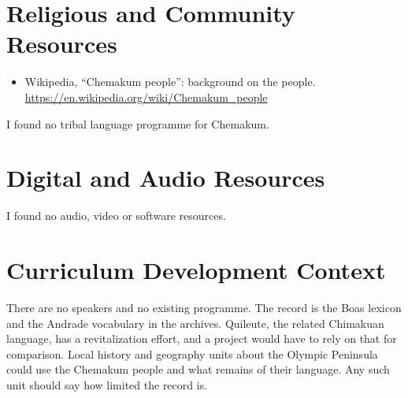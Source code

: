 \documentclass[12pt]{article}
\begin{document}
\section{Religious and Community Resources}
\begin{itemize}
\item Wikipedia, ``Chemakum people'': background on the people. \url{https://en.wikipedia.org/wiki/Chemakum_people}
\end{itemize}
I found no tribal language programme for Chemakum.

\section{Digital and Audio Resources}
I found no audio, video or software resources.

\section{Curriculum Development Context}
There are no speakers and no existing programme. The record is the Boas lexicon and the Andrade vocabulary in the archives. Quileute, the related Chimakuan language, has a revitalization effort, and a project would have to rely on that for comparison. Local history and geography units about the Olympic Peninsula could use the Chemakum people and what remains of their language. Any such unit should say how limited the record is.
\end{document}

